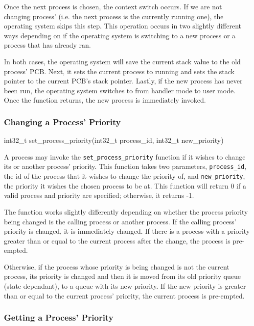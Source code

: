 \documentclass[se]{uw-wkrpt}
\begin{document}
Once the next process is chosen, the context switch occurs. If we are not changing process' (i.e. the next process is the currently running one), the operating system skips this step. This operation occurs in two slightly different ways depending on if the operating system is switching to a new process or a process that has already ran.

In both cases, the operating system will save the current stack value to the old process' PCB. Next, it sets the current process to running and sets the stack pointer to the current PCB's stack pointer. Lastly, if the new process has never been run, the operating system switches to from handler mode to user mode. Once the function returns, the new process is immediately invoked.

\subsubsection{Changing a Process' Priority}

\begin{code}
int32_t set_process_priority(int32_t process_id, int32_t new_priority)
\end{code}

A process may invoke the \texttt{set\_process\_priority} function if it wishes to change its or another process' priority. This function takes two parameters, \texttt{process\_id}, the id of the process that it wishes to change the priority of, and \texttt{new\_priority}, the priority it wishes the chosen process to be at. This function will return 0 if a valid process and priority are specified; otherwise, it returns -1.

The function works slightly differently depending on whether the process priority being changed is the calling process or another process. If the calling process' priority is changed, it is immediately changed. If there is a process with a priority greater than or equal to the current process after the change, the process is pre-empted. 

Otherwise, if the process whose priority is being changed is not the current process, its priority is changed and then it is moved from its old priority queue (state dependant), to a queue with its new priority. If the new priority is greater than or equal to the current process' priority, the current process is pre-empted.

\subsubsection{Getting a Process' Priority}
\end{document}
